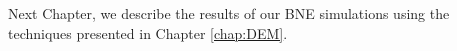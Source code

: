     Next Chapter, we describe the results of our BNE simulations using the techniques presented in Chapter \ref{chap:DEM}.


